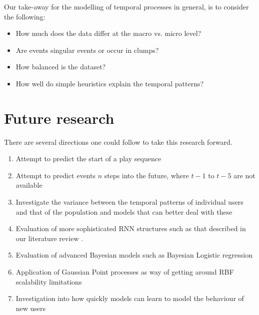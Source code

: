 Our take-away for the modelling of temporal processes in general, is to consider the following:
\begin{itemize}
	\item How much does the data differ at the macro vs. micro level?
	\item Are events singular events or occur in clumps?
	\item How balanced is the dataset?
	\item How well do simple heuristics explain the temporal patterns?
\end{itemize}

\section{Future research}

There are several directions one could follow to take this research forward.
\begin{enumerate}
	\item Attempt to predict the start of a play sequence
	\item Attempt to predict events $n$ steps into the future, where $t-1$ to $t-5$ are not available
	\item Investigate the variance between the temporal patterns of individual users and that of the population and models that can better deal with these
	\item Evaluation of more sophisticated RNN structures such as that described in our literature review \parencite{xiao2017modeling}.
	\item Evaluation of advanced Bayesian models such as Bayesian Logistic regression
	\item Application of Gaussian Point processes as way of getting around RBF scalability limitations
	\item Investigation into how quickly models can learn to model the behaviour of new users
\end{enumerate}